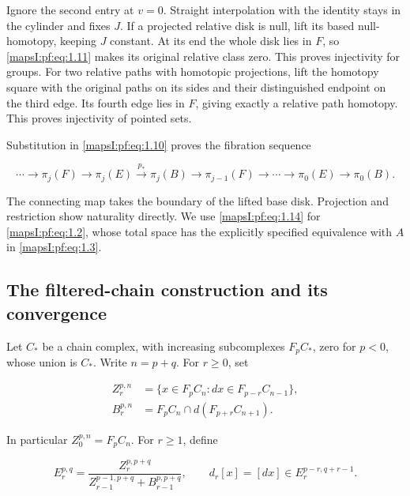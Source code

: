 \documentclass[11pt]{article}
\begin{document}
Ignore the second entry at \(v=0\). Straight interpolation with the identity stays in the cylinder and fixes \(J\). If a projected relative disk is null, lift its based null-homotopy, keeping \(J\) constant. At its end the whole disk lies in \(F\), so \eqref{mapsI:pf:eq:1.11} makes its original relative class zero. This proves injectivity for groups. For two relative paths with homotopic projections, lift the homotopy square with the original paths on its sides and their distinguished endpoint on the third edge. Its fourth edge lies in \(F\), giving exactly a relative path homotopy. This proves injectivity of pointed sets.

Substitution in \eqref{mapsI:pf:eq:1.10} proves the fibration sequence

\begin{equation}
\cdots\to\pi_j(F)\to\pi_j(E)\xrightarrow{p_*}\pi_j(B)
\to\pi_{j-1}(F)\to\cdots\to\pi_0(E)\to\pi_0(B).
\label{mapsI:pf:eq:1.14}
\end{equation}

The connecting map takes the boundary of the lifted base disk. Projection and restriction show naturality directly. We use \eqref{mapsI:pf:eq:1.14} for \eqref{mapsI:pf:eq:1.2}, whose total space has the explicitly specified equivalence with \(A\) in \eqref{mapsI:pf:eq:1.3}.

\subsection{The filtered-chain construction and its convergence}
\label{mapsI:pf:filtered-chains}

Let \(C_*\) be a chain complex, with increasing subcomplexes \(F_pC_*\), zero for \(p<0\), whose union is \(C_*\). Write \(n=p+q\). For \(r\geq0\), set

\begin{equation}
\begin{aligned}
Z_r^{p,n}&=\{x\in F_pC_n:dx\in F_{p-r}C_{n-1}\},\\
B_r^{p,n}&=F_pC_n\cap d(F_{p+r}C_{n+1}).
\end{aligned}
\label{mapsI:pf:eq:2.1}
\end{equation}

In particular \(Z_0^{p,n}=F_pC_n\). For \(r\geq1\), define

\begin{equation}
E_r^{p,q}=
\frac{Z_r^{p,p+q}}
{Z_{r-1}^{p-1,p+q}+B_{r-1}^{p,p+q}},
\qquad
d_r[x]=[dx]\in E_r^{p-r,q+r-1}.
\label{mapsI:pf:eq:2.2}
\end{equation}
\end{document}
